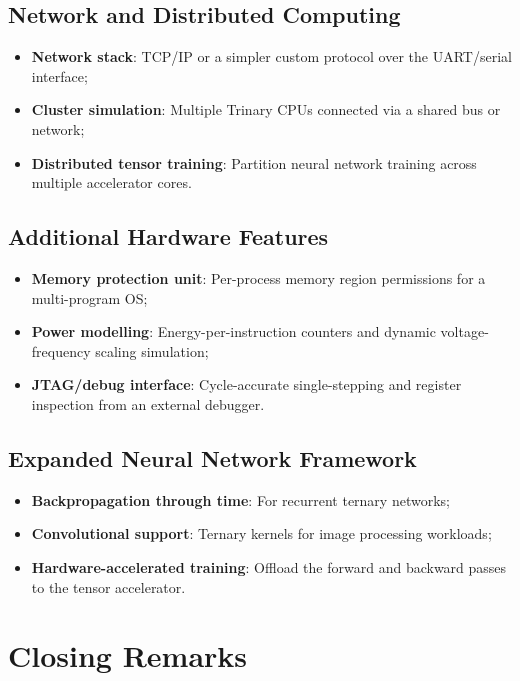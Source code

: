 \documentclass[12pt,a4paper,twoside]{book}
\theoremstyle{trinarytheorem}
\theoremstyle{trinarydefinition}
\begin{document}
\subsection{Network and Distributed Computing}

\begin{itemize}
    \item \textbf{Network stack}: TCP/IP or a simpler custom protocol
          over the UART/serial interface;
    \item \textbf{Cluster simulation}: Multiple Trinary CPUs connected
          via a shared bus or network;
    \item \textbf{Distributed tensor training}: Partition neural network
          training across multiple accelerator cores.
\end{itemize}

\subsection{Additional Hardware Features}

\begin{itemize}
    \item \textbf{Memory protection unit}: Per-process memory region
          permissions for a multi-program OS;
    \item \textbf{Power modelling}: Energy-per-instruction counters
          and dynamic voltage-frequency scaling simulation;
    \item \textbf{JTAG/debug interface}: Cycle-accurate single-stepping
          and register inspection from an external debugger.
\end{itemize}

\subsection{Expanded Neural Network Framework}

\begin{itemize}
    \item \textbf{Backpropagation through time}: For recurrent ternary
          networks;
    \item \textbf{Convolutional support}: Ternary kernels for image
          processing workloads;
    \item \textbf{Hardware-accelerated training}: Offload the forward
          and backward passes to the tensor accelerator.
\end{itemize}

\section{Closing Remarks}
\end{document}
